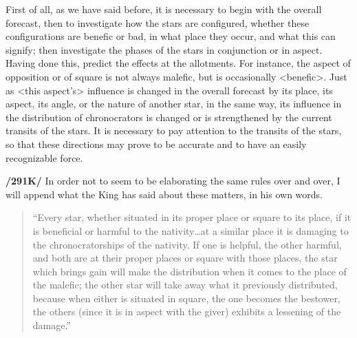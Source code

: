 First of \mnm all, as we have said before, it is necessary to begin with the overall forecast, then to investigate how the stars are configured, whether these configurations are benefic or bad, in what place they occur, and what this can signify; then investigate the phases of the stars in conjunction or in aspect. Having done this, predict the effects at the allotments. For \mndl instance, the aspect of opposition or of square is not always malefic, but is occasionally <benefic>. Just as <this aspect’s> influence is changed in the overall forecast by its place, its aspect, its angle, or the nature of another star, in the same way, its influence in the distribution of chronocrators is changed or is strengthened by the current transits of the stars. It is necessary to pay attention to the transits of the stars, so that these directions may prove to be accurate and to have an easily recognizable force.

\textbf{/291K/} In order not to seem to be elaborating the same rules over and over, I will append what the King has said about these matters, in his own words.
\begin{quote}
“Every star, whether situated in its proper place or square to its place, if it is beneficial or harmful to the nativity…at a similar place it is damaging to the chronocratorships of the nativity. If one is helpful, the other harmful, and both are at their proper places or square with those places, the star which brings gain will make the distribution when it comes to the place of the malefic; the other star will take away what it previously distributed, because when either is situated in square, the one becomes the bestower, the others (since it is in aspect with the giver) exhibits a lessening of the damage.”
\end{quote}

